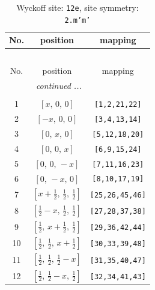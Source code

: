 \documentclass[fleqn,8pt]{jsarticle}
\begin{document}
\begin{longtable}{ccc}
\caption{Wyckoff site: {\tt 12e}, site symmetry: {\tt 2.m'm'}}
 \\
 \hline \hline
No. & position & mapping \\ \hline \endfirsthead

\multicolumn{2}{l}{\tablename\ \thetable{}} \\
 \hline \hline
No. & position & mapping \\ \hline \endhead

 \hline \hline
\multicolumn{2}{r}{\footnotesize\it continued ...} \\ \endfoot

 \hline \hline
\multicolumn{2}{r}{} \\ \endlastfoot

1 & $\left[ x,\, 0,\, 0 \right]$ & {\tt [1,2,21,22]} \\ \hline
2 & $\left[ - x,\, 0,\, 0 \right]$ & {\tt [3,4,13,14]} \\ \hline
3 & $\left[ 0,\, x,\, 0 \right]$ & {\tt [5,12,18,20]} \\ \hline
4 & $\left[ 0,\, 0,\, x \right]$ & {\tt [6,9,15,24]} \\ \hline
5 & $\left[ 0,\, 0,\, - x \right]$ & {\tt [7,11,16,23]} \\ \hline
6 & $\left[ 0,\, - x,\, 0 \right]$ & {\tt [8,10,17,19]} \\ \hline
7 & $\left[ x + \frac{1}{2},\, \frac{1}{2},\, \frac{1}{2} \right]$ & {\tt [25,26,45,46]} \\ \hline
8 & $\left[ \frac{1}{2} - x,\, \frac{1}{2},\, \frac{1}{2} \right]$ & {\tt [27,28,37,38]} \\ \hline
9 & $\left[ \frac{1}{2},\, x + \frac{1}{2},\, \frac{1}{2} \right]$ & {\tt [29,36,42,44]} \\ \hline
10 & $\left[ \frac{1}{2},\, \frac{1}{2},\, x + \frac{1}{2} \right]$ & {\tt [30,33,39,48]} \\ \hline
11 & $\left[ \frac{1}{2},\, \frac{1}{2},\, \frac{1}{2} - x \right]$ & {\tt [31,35,40,47]} \\ \hline
12 & $\left[ \frac{1}{2},\, \frac{1}{2} - x,\, \frac{1}{2} \right]$ & {\tt [32,34,41,43]} \\
\end{longtable}
\renewcommand{\arraystretch}{1.2}
\end{document}
